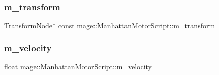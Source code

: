 \subsubsection{\texorpdfstring{m\+\_\+transform}{m\_transform}}
{\footnotesize\ttfamily \hyperlink{classmage_1_1_transform_node}{Transform\+Node}$\ast$ const mage\+::\+Manhattan\+Motor\+Script\+::m\+\_\+transform\hspace{0.3cm}{\ttfamily [private]}}

\hypertarget{classmage_1_1_manhattan_motor_script_a824893c374fa6f271a964751dc1a59ec}{}\label{classmage_1_1_manhattan_motor_script_a824893c374fa6f271a964751dc1a59ec} 
\subsubsection{\texorpdfstring{m\+\_\+velocity}{m\_velocity}}
{\footnotesize\ttfamily float mage\+::\+Manhattan\+Motor\+Script\+::m\+\_\+velocity\hspace{0.3cm}{\ttfamily [private]}}

